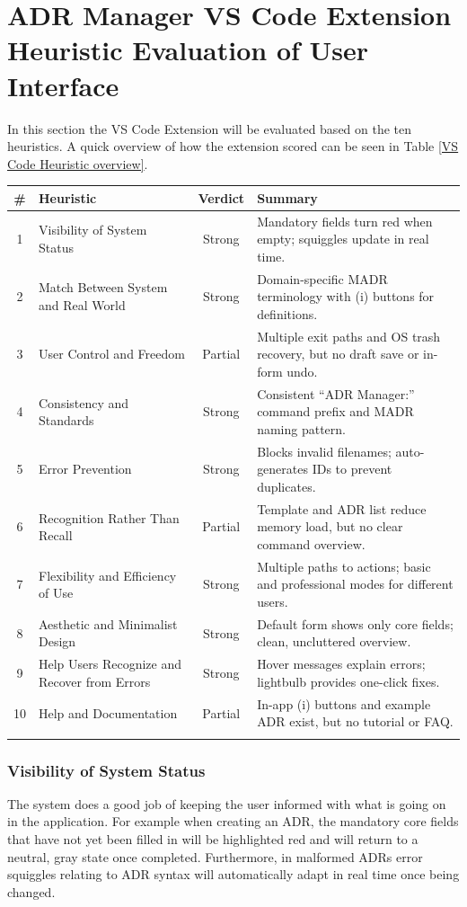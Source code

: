 \documentclass{article}
\begin{document}
\section{ADR Manager VS Code Extension Heuristic Evaluation of User Interface}
In this section the VS Code Extension will be evaluated based on the ten heuristics. A quick overview of how the extension scored can be seen in Table \ref{VS Code Heuristic overview}.


\begin{tabular}{|c|p{4cm}|c|p{6cm}|}
\hline
\textbf{\#} & \textbf{Heuristic} & \textbf{Verdict} & \textbf{Summary} \\
\hline
1 & Visibility of System Status & Strong & Mandatory fields turn red when empty; squiggles update in real time. \\
\hline
2 & Match Between System and Real World & Strong & Domain-specific MADR terminology with (i) buttons for definitions. \\
\hline
3 & User Control and Freedom & Partial & Multiple exit paths and OS trash recovery, but no draft save or in-form undo. \\
\hline
4 & Consistency and Standards & Strong & Consistent ``ADR Manager:'' command prefix and MADR naming pattern. \\
\hline
5 & Error Prevention & Strong & Blocks invalid filenames; auto-generates IDs to prevent duplicates. \\
\hline
6 & Recognition Rather Than Recall & Partial & Template and ADR list reduce memory load, but no clear command overview. \\
\hline
7 & Flexibility and Efficiency of Use & Strong & Multiple paths to actions; basic and professional modes for different users. \\
\hline
8 & Aesthetic and Minimalist Design & Strong & Default form shows only core fields; clean, uncluttered overview. \\
\hline
9 & Help Users Recognize and Recover from Errors & Strong & Hover messages explain errors; lightbulb provides one-click fixes. \\
\hline
10 & Help and Documentation & Partial & In-app (i) buttons and example ADR exist, but no tutorial or FAQ. \\
\hline
\label{VS Code Heuristic overview}
\end{tabular}


\subsubsection{Visibility of System Status}
The system does a good job of keeping the user informed with what is going on in the application. For example when creating an ADR, the mandatory core fields that have not yet been filled in will be highlighted red and will return to a neutral, gray state once completed. Furthermore, in malformed ADRs error squiggles relating to ADR syntax will automatically adapt in real time once being changed.
\end{document}
